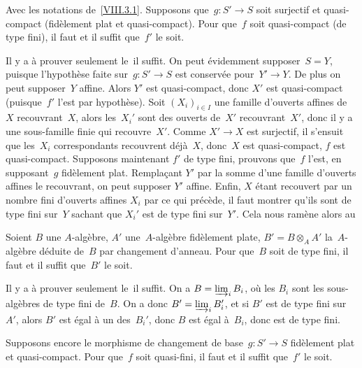 \begin{proposition}
\label{VIII.3.3}
Avec les notations de~\ref{VIII.3.1}. Supposons que~$g\colon S'\to S$
soit surjectif et quasi-compact (\resp fid\`element plat et
quasi-compact). Pour que~$f$ soit quasi-compact (\resp de type fini),
il faut et il suffit que~$f'$ le soit.
\end{proposition}

Il
y a \`a prouver seulement le~\og il suffit\fg. On peut \'evidemment
supposer~$S=Y$, puisque l'hypoth\`ese faite sur~$g\colon S'\to S$
est conserv\'ee pour~$Y'\to Y$. De plus on peut supposer~$Y$
affine. Alors $Y'$ est quasi-compact, donc $X'$ est quasi-compact
(puisque~$f'$ l'est par hypoth\`ese). Soit $(X_{i})_{i\in I}$ une
famille d'ouverts affines de~$X$ recouvrant~$X$, alors les~$X_{i}'$
sont des ouverts de~$X'$ recouvrant~$X'$, donc il y a une sous-famille
finie qui recouvre~$X'$. Comme $X'\to X$ est surjectif, il s'ensuit
que les~$X_{i}$ correspondants recouvrent d\'ej\`a~$X$, donc~$X$ est
quasi-compact, \ie $f$ est quasi-compact. Supposons maintenant $f'$
de type fini, prouvons que~$f$ l'est, en supposant~$g$ fid\`element
plat. Rempla\c cant $Y'$ par la somme d'une famille d'ouverts
affines le recouvrant, on peut supposer $Y'$ affine. Enfin, $X$
\'etant recouvert par un nombre fini d'ouverts affines $X_{i}$ par
ce qui pr\'ec\`ede, il faut montrer qu'ils sont de type fini sur~$Y$ sachant que $X_{i}'$ est de type fini sur~$Y'$. Cela nous
ram\`ene alors au

\begin{corollaire}
\label{VIII.3.4}
Soient $B$ une $A$-alg\`ebre, $A'$ une~$A$-alg\`ebre
fid\`element plate, $B'=B\otimes_{A}A'$ la~$A$-alg\`ebre
d\'eduite de~$B$ par changement d'anneau. Pour que~$B$ soit de type
fini, il faut et il suffit que~$B'$ le soit.
\end{corollaire}

Il y a \`a prouver seulement le~\og il suffit\fg. On a
$B=\varinjlim_i B_{i}$, o\`u les $B_{i}$ sont les
sous-alg\`ebres de type fini de~$B$. On a donc
$B'=\varinjlim_i B_{i}'$, et si $B'$ est de type fini
sur~$A'$, alors $B'$ est \'egal \`a un des~$B_{i}'$, donc $B$ est
\'egal \`a~$B_{i}$, donc est de type fini.

\begin{corollaire}
\label{VIII.3.5}
Supposons encore le morphisme de changement de base~$g\colon S'\to S$
fid\`element plat et quasi-compact. Pour que~$f$ soit quasi-fini, il
faut et il suffit que~$f'$ le soit.
\end{corollaire}


